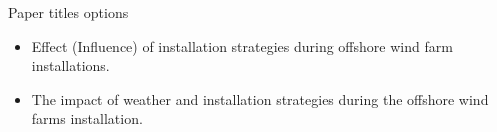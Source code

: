 Paper titles options
\begin{itemize}
\item Effect (Influence) of installation strategies during offshore wind farm installations.
\item The impact of weather and installation strategies during the offshore wind farms installation.
\end{itemize}